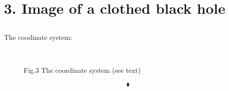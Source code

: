 \chapter{3. Image of a clothed black hole}
\pagebreak[4]

\section{}
\begin{tcolorbox}
The coodinate system:
\end{tcolorbox}
\begin{figure}[H]%
    \centering
\\
\caption{Fig.3 The coordinate system (see text)}
\label{fig:fig3}
\end{figure}
$$\blacklozenge$$\newpage